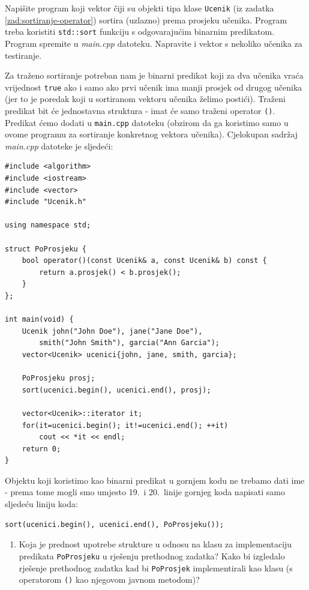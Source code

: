 \begin{zadatak}
Napišite program koji vektor čiji su objekti tipa klase \texttt{Ucenik}
(iz zadatka \ref{zad:sortiranje-operator})
sortira (uzlazno) prema prosjeku učenika.
Program treba koristiti \texttt{std::sort} funkciju s odgovarajućim binarnim predikatom.
Program spremite u \textit{main.cpp} datoteku. Napravite i vektor s nekoliko učenika za testiranje.
\end{zadatak}

\begin{rjesenje}
Za traženo sortiranje potreban nam je binarni predikat koji za dva učenika
vraća vrijednost \texttt{true} 
ako i samo ako prvi učenik ima manji prosjek od drugog učenika
(jer to je poredak koji u sortiranom vektoru učenika želimo postići).
Traženi predikat bit će jednostavna struktura - imat će samo traženi operator \texttt{()}.
Predikat ćemo dodati u \texttt{main.cpp} datoteku (obzirom da ga koristimo samo 
u ovome programu za sortiranje konkretnog vektora učenika).
Cjelokupan sadržaj \textit{main.cpp} datoteke je sljedeći:
\begin{verbatim}
#include <algorithm>
#include <iostream>
#include <vector>
#include "Ucenik.h"

using namespace std;

struct PoProsjeku {
    bool operator()(const Ucenik& a, const Ucenik& b) const {
        return a.prosjek() < b.prosjek();
    }
};

int main(void) {
    Ucenik john("John Doe"), jane("Jane Doe"),
        smith("John Smith"), garcia("Ann Garcia");
    vector<Ucenik> ucenici{john, jane, smith, garcia};
    
    PoProsjeku prosj;
    sort(ucenici.begin(), ucenici.end(), prosj);
    
    vector<Ucenik>::iterator it;
    for(it=ucenici.begin(); it!=ucenici.end(); ++it)
        cout << *it << endl;
    return 0;
}
\end{verbatim}

Objektu koji koristimo kao binarni predikat u gornjem kodu ne trebamo dati ime - 
prema tome mogli smo umjesto 19.\ i 20.\ linije gornjeg koda napisati samo sljedeću liniju koda:
\begin{verbatim}
sort(ucenici.begin(), ucenici.end(), PoProsjeku());
\end{verbatim}
\end{rjesenje}


\begin{razmisljanje}
    \begin{enumerate}
        \item 
        Koja je prednost upotrebe strukture u odnosu na klasu za implementaciju
        predikata \texttt{PoProsjeku} u rješenju prethodnog zadatka?
        Kako bi izgledalo rješenje prethodnog zadatka kad bi \texttt{PoProsjek}
        implementirali kao klasu (s operatorom \texttt{()} kao njegovom javnom metodom)?
    \end{enumerate}
\end{razmisljanje}


